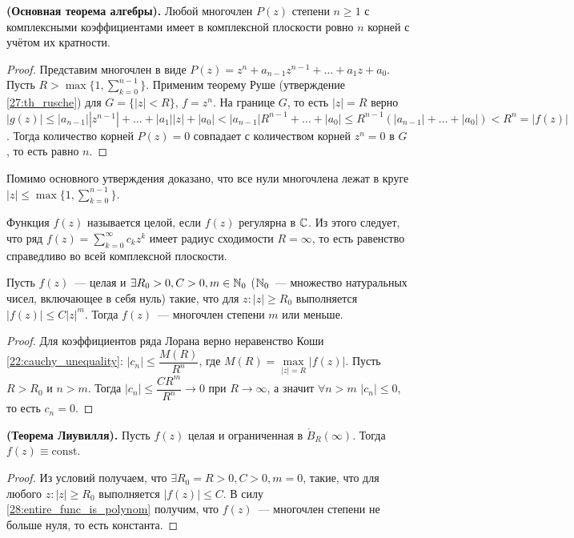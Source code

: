 \begin{statement}
\textbf{(Основная теорема алгебры).} Любой многочлен \(P(z)\) степени \(n \ge 1\) с комплексными
коэффициентами имеет в комплексной плоскости ровно \(n\) корней с учётом их кратности.
\end{statement}

\begin{proof}
Представим многочлен в виде \(P(z) = z^n + a_{n-1}z^{n-1} + \dots + a_1 z + a_0\). Пусть \(R >
\max \{1, \sum\limits_{k=0}^{n-1}\}\). Применим теорему Руше (утверждение \ref{27:th_rusche}) для
\(G = \{|z| < R\}\), \(f = z^n\). На границе \(G\), то есть \(|z| = R\) верно \(|g(z)| \le |a_{n-1}|
|z^{n-1}| + \dots + |a_1||z| + |a_0| < |a_{n-1}| R^{n-1} + \dots + |a_0| \le R^{n-1}(|a_{n-1}| + 
\dots + |a_0|) < R^n = |f(z)|\). Тогда количество корней \(P(z) = 0\) совпадает с количеством корней
\(z^n = 0\) в \(G\), то есть равно \(n\). 
\end{proof}

\begin{note}
Помимо основного утверждения доказано, что все нули многочлена лежат в круге \(|z| \le \max\{1, 
\sum\limits_{k=0}^{n-1}\}\).
\end{note}



\begin{definition}
Функция \(f(z)\) называется целой, если \(f(z)\) регулярна в \(\mathbb{C}\). Из этого следует, что ряд
\(f(z) = \sum\limits_{k = 0}^\infty c_k z^k\) имеет радиус сходимости \(R = \infty\), то есть
равенство справедливо во всей комплексной плоскости.
\end{definition}

\begin{statement}\label{28:entire_func_is_polynom}
Пусть \(f(z)\)~--- целая и \(\exists R_0 > 0, C > 0, m \in \mathbb{N}_0\) (\(\mathbb{N}_0\)~--- множество
натуральных чисел, включающее в себя нуль) такие, что для \(z\colon |z| \ge R_0\) выполняется
\(|f(z)| \le C|z|^m\). Тогда \(f(z)\)~--- многочлен степени \(m\) или меньше.
\end{statement}

\begin{proof}
Для коэффициентов ряда Лорана верно неравенство Коши \eqref{22:cauchy_unequality}: \(|c_n| \le 
\dfrac{M(R)}{R^n}\), где \(M(R) = \max\limits_{|z| = R}|f(z)|\). Пусть \(R > R_0\) и \(n > m\).
Тогда \(|c_n| \le \dfrac{C R^m}{R^n} \rightarrow 0\) при \(R \to \infty\), а значит \(\forall n > m
\) \(|c_n| \le 0\), то есть \(c_n = 0\).
\end{proof}

\begin{corollary}
\textbf{(Теорема Лиувилля).} Пусть \(f(z)\) целая и ограниченная в \(\mathring{B}_R(\infty)\). Тогда
\(f(z) \equiv \mathrm{const}\).
\end{corollary}

\begin{proof}
Из условий получаем, что \(\exists R_0 = R > 0, C > 0, m = 0\), такие, что для любого \(z \colon
|z| \ge R_0\) выполняется \(|f(z)| \le C\). В силу \ref{28:entire_func_is_polynom} получим, что
\(f(z)\)~--- многочлен степени не больше нуля, то есть константа.
\end{proof}